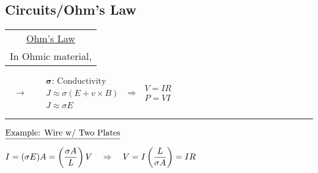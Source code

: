\documentclass[12pt]{article}
\begin{document}
%
%
\newpage
\subsection{Circuits/Ohm's Law}
\noindent
\begin{tabular}{c}
	\underline{Ohm's Law}\\[5pt]
	In Ohmic material, 
\end{tabular}
\ \ \(\rightarrow\) \ \ \
\( \begin{gathered}
	\boldsymbol{\sigma} \text{: Conductivity}\\[5pt]
	J \approx \sigma (E + v \times B)\\
	\boxed{ J \approx \sigma E }
\end{gathered} \)
\indent \(\Rightarrow\) \indent
\( \begin{gathered}
	\boxed{V = IR}\\
	\boxed{P = VI}
\end{gathered} \)
\indent \rule[-35pt]{.5pt}{70pt} \indent 
\( \begin{aligned}
	&\text{\underline{Example: Wire w/ Two Plates}} \\[5pt]
	&I = (\sigma E) A = \left( \frac{\sigma A}{L} \right) V \ \ \ \Rightarrow \ \ \
	V = I \left( \frac{L}{\sigma A} \right) = IR
\end{aligned} \)
\end{document}
